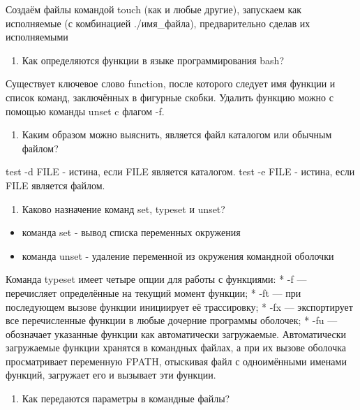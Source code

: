 Создаём файлы командой touch (как и любые другие), запускаем как
исполняемые (с комбинацией ./имя\_файла), предварительно сделав их
исполняемыми

\begin{enumerate}
\def\labelenumi{\arabic{enumi}.}
\setcounter{enumi}{10}
\tightlist
\item
  Как определяются функции в языке программирования bash?
\end{enumerate}

Существует ключевое слово function, после которого следует имя функции и
список команд, заключённых в фигурные скобки. Удалить функцию можно с
помощью команды unset c флагом -f.

\begin{enumerate}
\def\labelenumi{\arabic{enumi}.}
\setcounter{enumi}{11}
\tightlist
\item
  Каким образом можно выяснить, является файл каталогом или обычным
  файлом?
\end{enumerate}

test -d FILE - истина, если FILE является каталогом. test -e FILE -
истина, если FILE является файлом.

\begin{enumerate}
\def\labelenumi{\arabic{enumi}.}
\setcounter{enumi}{12}
\tightlist
\item
  Каково назначение команд set, typeset и unset?
\end{enumerate}

\begin{itemize}
\tightlist
\item
  команда set - вывод списка переменных окружения
\item
  команда unset - удаление переменной из окружения командной оболочки
\end{itemize}

Команда typeset имеет четыре опции для работы с функциями: * -f ---
перечисляет определённые на текущий момент функции; * -ft --- при
последующем вызове функции инициирует её трассировку; * -fx ---
экспортирует все перечисленные функции в любые дочерние программы
оболочек; * -fu --- обозначает указанные функции как автоматически
загружаемые. Автоматически загружаемые функции хранятся в командных
файлах, а при их вызове оболочка просматривает переменную FPATH,
отыскивая файл с одноимёнными именами функций, загружает его и вызывает
эти функции.

\begin{enumerate}
\def\labelenumi{\arabic{enumi}.}
\setcounter{enumi}{13}
\tightlist
\item
  Как передаются параметры в командные файлы?
\end{enumerate}


